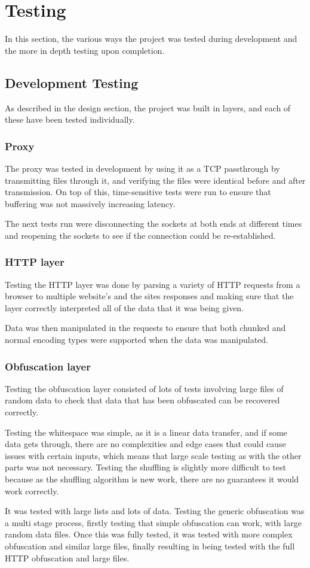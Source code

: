 \def\listingsfont{\ttfamily}
\section{Testing}
In this section, the various ways the project was tested during development and the more in depth testing upon completion.
\subsection{Development Testing}
As described in the design section, the project was built in layers, and each of these have been tested individually.
\subsubsection*{Proxy}
The proxy was tested in development by using it as a TCP passthrough by transmitting files through it, and verifying the files were identical before and after transmission.
On top of this, time-sensitive tests were run to ensure that buffering was not massively increasing latency.\par
The next tests run were disconnecting the sockets at both ends at different times and reopening the sockets to see if the connection could be re-established.\par
\subsubsection*{HTTP layer}
Testing the HTTP layer was done by parsing a variety of HTTP requests from a browser to multiple website's and the sites responses and making sure that the layer correctly interpreted all of the data that it was being given.\par
Data was then manipulated in the requests to ensure that both chunked and normal encoding types were supported when the data was manipulated.
\subsubsection*{Obfuscation layer}
Testing the obfuscation layer consisted of lots of tests involving large files of random data to check that data that has been obfuscated can be recovered correctly.\par
Testing the whitespace was simple, as it is a linear data transfer, and if some data gets through, there are no complexities and edge cases that could cause issues with certain inputs, which means that large scale testing as with the other parts was not necessary.
Testing the shuffling is slightly more difficult to test because as the shuffling algorithm is new work, there are no guarantees it would work correctly.\par It was tested with large lists and lots of data.
Testing the generic obfuscation was a multi stage process, firstly testing that simple obfuscation can work, with large random data files. Once this was fully tested, it was tested with more complex obfuscation and similar large files, finally resulting in being tested with the full HTTP obfuscation and large files.
